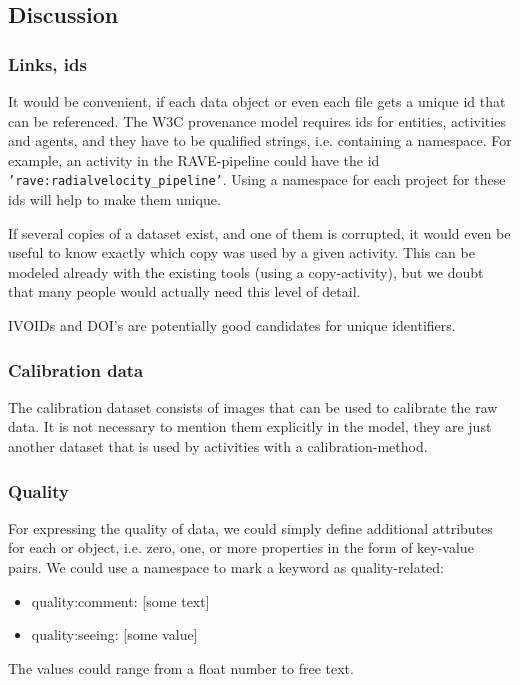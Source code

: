 \subsection{Discussion}


\subsubsection{Links, ids}\label{sec:links_between_data}
It would be convenient, if each data object or even each file 
gets a unique id that can be referenced. The W3C provenance model requires ids
for entities, activities and agents, and they have to be qualified strings, 
i.e. containing a namespace. For example, an activity in the RAVE-pipeline could 
have the id \texttt{'rave:radialvelocity\_pipeline'}. Using a namespace for each 
project for these ids will help to make them unique. 

If several copies of a dataset exist, and one of them is corrupted, it would even be useful to know
exactly which copy was used by a given activity. This can be modeled already 
with the existing tools (using a copy-activity), but we doubt that many people
would actually need this level of detail.

IVOIDs and DOI's are potentially good candidates for unique identifiers.


\subsubsection{Calibration data}
The calibration dataset consists of images that can be used to calibrate the
raw data. It is not necessary to mention them explicitly in the model, 
they are just another dataset that is used by activities with a 
calibration-method.




\subsubsection{Quality}
For expressing the quality of data, we could simply define additional 
attributes for each 
or  object, i.e. zero, one, or more properties in the form of
key-value pairs. We could use a  namespace to mark a keyword
as quality-related:
\begin{itemize}
    \item quality:comment: [some text]
    \item quality:seeing: [some value]
\end{itemize}
The values could range from a float number to free text.


